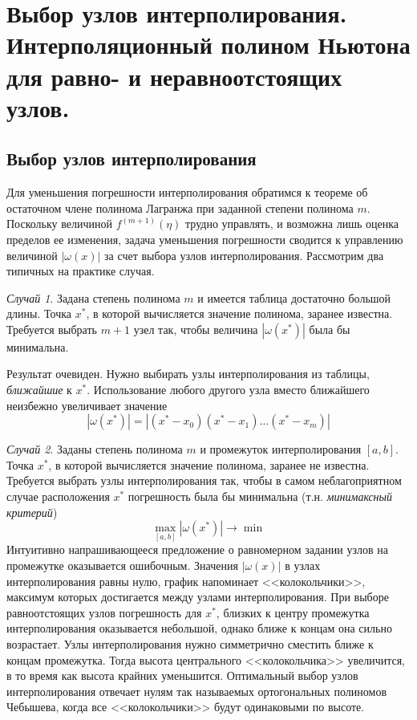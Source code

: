 \documentclass[../../calc-math-exam-2023.tex]{subfiles}
\begin{document}
    \section{Выбор узлов интерполирования. Интерполяционный полином Ньютона для равно- и неравноотстоящих узлов.}\label{sec:ch07}
    \subsection{Выбор узлов интерполирования}
    Для уменьшения погрешности интерполирования обратимся к теореме об остаточном члене
    полинома Лагранжа при заданной степени полинома $m$. Поскольку величиной $\displaystyle f^{(m+1)}(\eta)$ трудно управлять,
    и возможна лишь оценка пределов ее изменения, задача уменьшения погрешности сводится
    к управлению величиной $|\omega(x)|$ за счет выбора узлов интерполирования. Рассмотрим
    два типичных на практике случая.

    \emph{Случай 1}. Задана степень полинома $m$ и имеется таблица достаточно большой длины.
    Точка $x^{*}$, в которой вычисляется значение полинома, заранее известна. Требуется
    выбрать $m+1$ узел так, чтобы величина $|\omega(x^{*})|$ была бы минимальна.

    Результат очевиден. Нужно выбирать узлы интерполирования из таблицы,
    \emph{ближайшие} к $x^{*}$. Использование любого другого узла вместо ближайшего
    неизбежно увеличивает значение
    \begin{equation*}
        |\omega(x^{*})| = |\left( x^{*} - x_0 \right)\left( x^{*} - x_1 \right)\dots\left( x^{*} - x_m \right)|
    \end{equation*}

    \emph{Случай 2}. Заданы степень полинома $m$ и промежуток интерполирования $[a, b]$.
    Точка $x^{*}$, в которой вычисляется значение полинома, заранее не известна.
    Требуется выбрать узлы интерполирования так, чтобы в самом неблагоприятном случае
    расположения $x^{*}$ погрешность была бы минимальна (т.н. \emph{минимаксный критерий})
    \begin{equation*}
        \max_{[a, b]} |\omega(x^{*})| \rightarrow \min
    \end{equation*}
    Интуитивно напрашивающееся предложение о равномерном задании узлов на промежутке
    оказывается ошибочным. Значения $|\omega(x)|$ в узлах интерполирования равны нулю,
    график напоминает <<колокольчики>>, максимум которых достигается между узлами
    интерполирования. При выборе равноотстоящих узлов погрешность для $x^{*}$, близких
    к центру промежутка интерполирования оказывается небольшой, однако ближе к концам
    она сильно возрастает. Узлы интерполирования нужно симметрично сместить ближе к
    концам промежутка. Тогда высота центрального <<колокольчика>> увеличится, в то
    время как высота крайних уменьшится. Оптимальный выбор узлов интерполирования
    отвечает нулям так называемых ортогональных полиномов Чебышева, когда все
    <<колокольчики>> будут одинаковыми по высоте.
\end{document}
